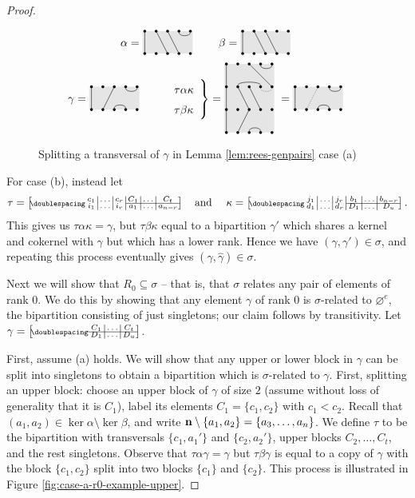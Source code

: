 \begin{lemma}
\begin{proof}
    \begin{figure}[ht]
      \centering
      $$
      \alpha = \bipartdiag{\tv11 \tv23 \tv34 \tc45} \qquad
      \beta = \bipartdiag{\tv11 \tv23 \tv34}
      $$
      $$
      \gamma = \bipartdiag{\tv11 \tc45 \bc34 \tv32} \qquad
      \left.
        \begin{array}{l}\tau\alpha\kappa\\ \tau\beta\kappa \end{array}
      \right\} = \triplebipartdiag{
        \uutv11\utv11\tv11
        \uutv35\uubc42\utv23\tv32
        \draw[densely dotted](5, 3.875) .. controls (5, 3.5) and (4, 3.5) .. (4, 3.875);
        \uutc45 \utv34 \bc34
      } = \bipartdiag{\tv11 \tc45 \bc34 \draw[densely dotted](3,2)--(2,0);}
      $$
      \caption{Splitting a transversal of $\gamma$ in Lemma
        \ref{lem:rees-genpairs} case (a)}
      \label{fig:case-a-hat-example}
    \end{figure}
    For case (b), instead let
    $$\tau = \bipart{c|c|c|c|c|c}{4-6}
    {c_1 & \ldots & c_r & C_1 & \ldots & C_t}
    {i_1 & \ldots & i_r & a_1 & \ldots & a_{n-r}} \text{\quad and \quad}
    \kappa = \bipart{c|c|c|c|c|c}{4-6}
    {j_1 & \ldots & j_r & b_1 & \ldots & b_{n-r}}
    {d_1 & \ldots & d_r & D_1 & \ldots & D_u}.$$
    This gives us $\tau\alpha\kappa = \gamma$, but $\tau\beta\kappa$ equal to a
    bipartition $\gamma'$ which shares a kernel and cokernel with $\gamma$ but
    which has a lower rank.  Hence we have $(\gamma, \gamma') \in \sigma$, and
    repeating this process eventually gives
    $(\gamma, \widehat\gamma) \in \sigma$.

    Next we will show that $R_0 \subseteq \sigma$ -- that is, that $\sigma$
    relates any pair of elements of rank $0$.  We do this by showing that any
    element $\gamma$ of rank $0$ is $\sigma$-related to $\varnothing^e$, the
    bipartition consisting of just singletons; our claim follows by
    transitivity.  Let
    $\gamma = \bipart{c|c|c}{1-3}{C_1 & \ldots & C_t}{D_1 & \ldots & D_u}$.

    First, assume (a) holds.  We will show that any upper or lower block in
    $\gamma$ can be split into singletons to obtain a bipartition which is
    $\sigma$-related to $\gamma$.  First, splitting an upper block: choose an
    upper block of $\gamma$ of size $2$ (assume without loss of generality that
    it is $C_1$), label its elements $C_1 = \{c_1, c_2\}$ with $c_1 < c_2$.
    Recall that $(a_1, a_2) \in \ker\alpha \setminus \ker\beta$, and
    write $\mathbf{n} \setminus \{a_1, a_2\} = \{a_3, \ldots, a_n\}$.  We define
    $\tau$ to be the bipartition with transversals $\{c_1, a_1'\}$ and
    $\{c_2, a_2'\}$, upper blocks $C_2, \ldots, C_t$, and the rest singletons.
    Observe that $\tau\alpha\gamma = \gamma$ but $\tau\beta\gamma$ is equal
    to a copy of $\gamma$ with the block $\{c_1, c_2\}$ split into two blocks
    $\{c_1\}$ and $\{c_2\}$.  This process is illustrated in Figure
    \ref{fig:case-a-r0-example-upper}.


\end{proof}
\end{lemma}
